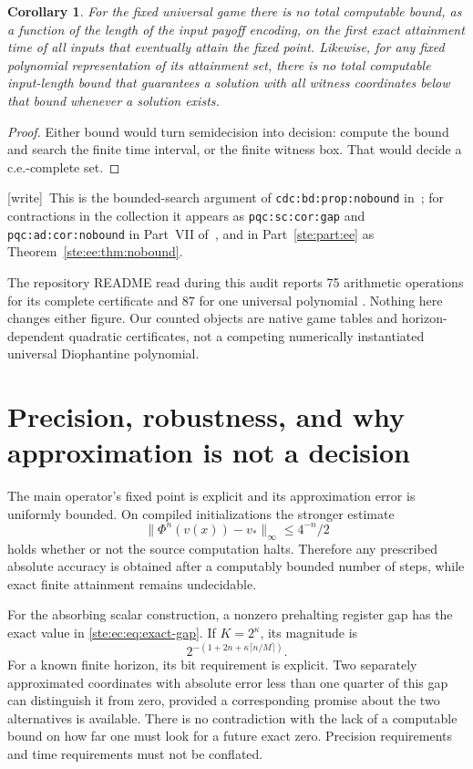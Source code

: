\documentclass[11pt,letterpaper]{article}
\newtheorem{corollary}[theorem]{Corollary}
\theoremstyle{definition}
\theoremstyle{remark}
\newcommand{\wtag}{\textup{[write]}}
\begin{document}
\begin{corollary}
\label{ste:ec:cor:no-cutoff}
For the fixed universal game there is no total computable bound, as a
function of the length of the input payoff encoding, on the first exact
attainment time of all inputs that eventually attain the fixed point.
Likewise, for any fixed polynomial representation of its attainment set,
there is no total computable input-length bound that guarantees a solution
with all witness coordinates below that bound whenever a solution exists.
\end{corollary}

\begin{proof}
Either bound would turn semidecision into decision: compute the bound and
search the finite time interval, or the finite witness box. That would
decide a c.e.-complete set.
\end{proof}

\wtag\ This is the bounded-search argument of \texttt{cdc:bd:prop:nobound} in~\cite{cdc}; for contractions in the collection it appears as \texttt{pqc:sc:cor:gap} and \texttt{pqc:ad:cor:nobound} in Part~VII of~\cite{pqc}, and in Part~\ref{ste:part:ee} as Theorem~\ref{ste:ee:thm:nobound}.

The repository README read during this audit reports 75 arithmetic
operations for its complete certificate and 87 for one universal polynomial
\cite{repoH10}. Nothing here changes either figure. Our counted objects
are native game tables and horizon-dependent quadratic certificates, not
a competing numerically instantiated universal Diophantine polynomial.

\section{Precision, robustness, and why approximation is not a decision}
\label{ste:ec:sec:precision}

The main operator's fixed point is explicit and its approximation error
is uniformly bounded. On compiled initializations the stronger estimate
\[
 \|\Phi^n(v(x))-v_*\|_\infty\leq 4^{-n}/2
\]
holds whether or not the source computation halts. Therefore any prescribed
absolute accuracy is obtained after a computably bounded number of steps,
while exact finite attainment remains undecidable.

For the absorbing scalar construction, a nonzero prehalting register gap
has the exact value in \eqref{ste:ec:eq:exact-gap}. If $K=2^\kappa$, its magnitude
is
\[
 2^{-(1+2n+\kappa\lceil n/M\rceil)}.
\]
For a known finite horizon, its bit requirement is explicit. Two separately
approximated coordinates with absolute error less than one quarter of this
gap can distinguish it from zero, provided a corresponding promise about
the two alternatives is available. There is no contradiction with the
lack of a computable bound on how far one must look for a future exact
zero. Precision requirements and time requirements must not be conflated.
\end{document}
